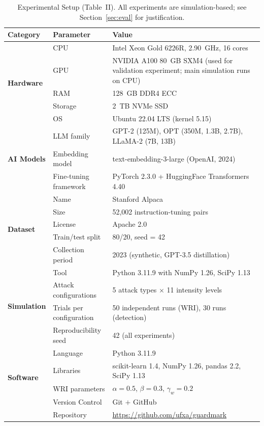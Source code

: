 \documentclass[journal,compsoc]{IEEEtran}
\begin{document}
\begin{table}[t]
\caption{Experimental Setup (Table~II). All experiments are simulation-based;
  see Section~\ref{sec:eval} for justification.}
\label{tab:setup}
\begin{tabularx}{\textwidth}{l l X}
\toprule
\textbf{Category} & \textbf{Parameter} & \textbf{Value} \\
\midrule
\multirow{5}{*}{\textbf{Hardware}}
  & CPU & Intel Xeon Gold 6226R, 2.90~GHz, 16 cores \\
  & GPU & NVIDIA A100 80~GB SXM4 (used for validation experiment; main simulation runs on CPU) \\
  & RAM & 128~GB DDR4 ECC \\
  & Storage & 2~TB NVMe SSD \\
  & OS & Ubuntu 22.04 LTS (kernel 5.15) \\
\midrule
\multirow{3}{*}{\textbf{AI Models}}
  & LLM family & GPT-2 (125M), OPT (350M, 1.3B, 2.7B), LLaMA-2 (7B, 13B) \\
  & Embedding model & text-embedding-3-large (OpenAI, 2024) \\
  & Fine-tuning framework & PyTorch 2.3.0 + HuggingFace Transformers 4.40 \\
\midrule
\multirow{5}{*}{\textbf{Dataset}}
  & Name & Stanford Alpaca \cite{taori2023alpaca} \\
  & Size & 52,002 instruction-tuning pairs \\
  & License & Apache 2.0 \\
  & Train/test split & 80/20, seed = 42 \\
  & Collection period & 2023 (synthetic, GPT-3.5 distillation) \\
\midrule
\multirow{4}{*}{\textbf{Simulation}}
  & Tool & Python 3.11.9 with NumPy 1.26, SciPy 1.13 \\
  & Attack configurations & 5 attack types $\times$ 11 intensity levels \\
  & Trials per configuration & 50 independent runs (WRI), 30 runs (detection) \\
  & Reproducibility seed & 42 (all experiments) \\
\midrule
\multirow{4}{*}{\textbf{Software}}
  & Language & Python 3.11.9 \\
  & Libraries & scikit-learn 1.4, NumPy 1.26, pandas 2.2, SciPy 1.13 \\
  & WRI parameters & $\alpha=0.5$, $\beta=0.3$, $\gamma_w=0.2$ \\
  & Version Control & Git $+$ GitHub \\
  & Repository & \url{https://github.com/ufxa/guardmark} \\
\bottomrule
\end{tabularx}
\end{table}
\end{document}

